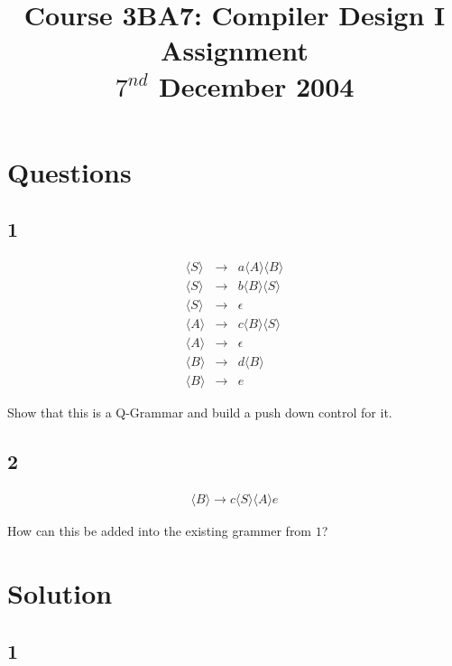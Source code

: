 \documentclass[a4paper,12pt]{article}
\newcommand{\nonterminal}[1]{\langle #1 \rangle}
\begin{document}
\title{Course 3BA7: Compiler Design I \\ Assignment \\ $7^{nd}$ December 2004}

\maketitle

\section*{Questions}

\subsection*{1}

\begin{eqnarray}
\nonterminal{S}	&	\to	&	a \nonterminal{A} \nonterminal{B}	\\	
\nonterminal{S}	&	\to	&	b \nonterminal{B} \nonterminal{S}	\\	
\nonterminal{S}	&	\to	&	\epsilon										\\	
\nonterminal{A}	&	\to	&	c \nonterminal{B} \nonterminal{S}	\\	
\nonterminal{A}	&	\to	&	\epsilon										\\
\nonterminal{B}	&	\to	&	d \nonterminal{B}							\\	
\nonterminal{B}	&	\to	&	e 													
\end{eqnarray}

Show that this is a Q-Grammar and build a push down control for it.

\subsection*{2}

\begin{eqnarray}
\nonterminal{B} \to c \nonterminal{S} \nonterminal{A} e
\end{eqnarray}

How can this be added into the existing grammer from $1$?

\section*{Solution}

\subsection*{1}
\end{document}
